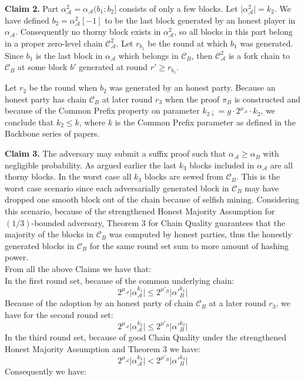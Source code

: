 \textbf{Claim 2.}
Part $\alpha_\mathcal{A}^2 = \alpha_\mathcal{A}(b_1:b_2]$ consists of only a few blocks. Let $ \vert \alpha_\mathcal{A}^2 \vert = k_2$.
We have defined $b_2 = \alpha_\mathcal{A}^2[-1]$ to be the last block generated by an honest player in $\alpha_\mathcal{A}$. Consequently no thorny block exists in $\alpha_\mathcal{A}^2$, so all blocks in this part belong in a proper zero-level chain $\mathcal{C}_\mathcal{A}^2$.  Let $r_{b_1}$ be the round at which $b_1$ was generated.
Since $b_1$ is the last block in $\alpha_\mathcal{A}$ which belongs in $\mathcal{C}_B$, then $\mathcal{C}_\mathcal{A}^2$ is a fork chain to $\mathcal{C}_B$ at some block $b'$ generated at round $r' \geq r_{b_1}$.

Let $r_2$ be the round when $b_2$ was generated by an honest party. Because an honest party has chain $\mathcal{C}_B$ at later round $r_3$ when the proof $\pi_B$ is constructed and because of the Common Prefix property on parameter $k_{2\downarrow} = g \cdot 2^{\mu_\mathcal{A}} \cdot k_2$, we conclude that $k_2 \leq k$, where $k$ is the Common Prefix parameter as defined in the Backbone series of papers\cite{backbone}.

\textbf{Claim 3.} The adversary may submit a suffix proof such that $\alpha_\mathcal{A} \geq \alpha_B$
with negligible probability.
As argued earlier the last $k_3$ blocks included in $\alpha_\mathcal{A}$ are all thorny blocks. In the worst case  all $k_3 $ blocks
are sewed from $\mathcal{C}_B$. This is the worst case scenario since each adversarially
generated block in $\mathcal{C}_B$ may have dropped one smooth block out of the chain
because of selfish mining. Considering this scenario, because of the strengthened
Honest Majority Assumption for $(1/3)$-bounded adversary, Theorem 3 for Chain
Quality guarantees that the majority of the blocks in $\mathcal{C}_B$ was computed by
honest parties, thus the honestly generated blocks in $\mathcal{C}_B$ for the same round
set sum to more amount of hashing power.\\
From all the above Claims we have that:\\
In the first round set, because of the common underlying chain:
\begin{equation} \label{eq_v_round_set_1}
2^{\mu_\mathcal{A}} \vert \alpha_\mathcal{A}^{k_1} \vert \leq 2^{\mu'_B} \vert \alpha'{_B^{k_1}} \vert
\end{equation}
Because of the adoption by an honest party of chain $\mathcal{C}_B$ at a later round $r_3$, we
have for the second round set:
\begin{equation} \label{eq_v_round_set_2}
2^{\mu_\mathcal{A}} \vert \alpha_\mathcal{A}^{k_2} \vert \leq 2^{\mu'_B} \vert \alpha'{_B^{k_2}} \vert
\end{equation}
In the third round set, because of good Chain Quality under the strengthened Honest
Majority Assumption and Theorem 3 we have:
\begin{equation} \label{eq_v_round_set_3}
2^{\mu_\mathcal{A}} \vert \alpha_\mathcal{A}^{k_3} \vert < 2^{\mu'_B} \vert \alpha'{_B^{k_3}} \vert
\end{equation}
Consequently we have:

